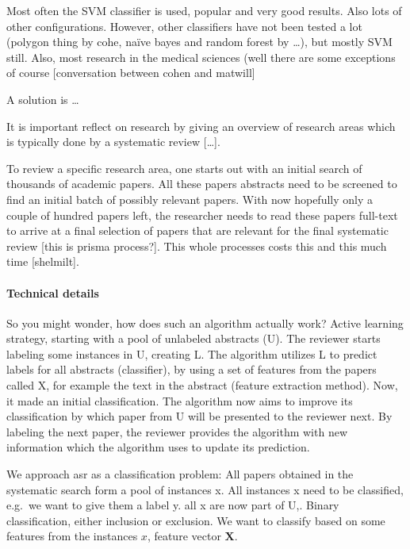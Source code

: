 \documentclass[
]{article}
\begin{document}
Most often the SVM classifier is used, popular and very good results.
Also lots of other configurations. However, other classifiers have not
been tested a lot (polygon thing by cohe, naïve bayes and random forest
by \ldots), but mostly SVM still. Also, most research in the medical
sciences (well there are some exceptions of course {[}conversation
between cohen and matwill{]}

A solution is \ldots{}

It is important reflect on research by giving an overview of research
areas which is typically done by a systematic review {[}\ldots{]}.

To review a specific research area, one starts out with an initial
search of thousands of academic papers. All these papers abstracts need
to be screened to find an initial batch of possibly relevant papers.
With now hopefully only a couple of hundred papers left, the researcher
needs to read these papers full-text to arrive at a final selection of
papers that are relevant for the final systematic review {[}this is
prisma process?{]}. This whole processes costs this and this much time
{[}shelmilt{]}.

\hypertarget{technical-details}{%
\paragraph{Technical details}\label{technical-details}}

So you might wonder, how does such an algorithm actually work? Active
learning strategy, starting with a pool of unlabeled abstracts (U). The
reviewer starts labeling some instances in U, creating L. The algorithm
utilizes L to predict labels for all abstracts (classifier), by using a
set of features from the papers called X, for example the text in the
abstract (feature extraction method). Now, it made an initial
classification. The algorithm now aims to improve its classification by
which paper from U will be presented to the reviewer next. By labeling
the next paper, the reviewer provides the algorithm with new information
which the algorithm uses to update its prediction.

We approach asr as a classification problem: All papers obtained in the
systematic search form a pool of instances x. All instances x need to be
classified, e.g.~we want to give them a label y. all x are now part of
U,. Binary classification, either inclusion or exclusion. We want to
classify based on some features from the instances \(x\), feature vector
\(\mathbf{X}\).
\end{document}
